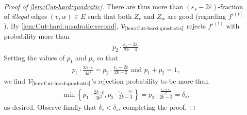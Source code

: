 \documentclass[11pt,fleqn]{article}
\renewcommand{\epsilon}{\varepsilon}
\renewcommand{\bar}{\overline}
\newcommand{\V}{\calV}
\newcommand{\f}{f}
\newcommand{\Vquad}{\V_{\text{\ref{lem:Cut-hard:quadratic}}}}
\newcommand{\calV}{\mathcal{V}}
\theoremstyle{definition}
\numberwithin{equation}{section}
\begin{document}
\begin{proof}[Proof of \cref{lem:Cut-hard:quadratic}]
There are thus more than $(\epsilon_s - 2 \bar{\epsilon})$-fraction of \emph{illegal} edges $(v,w) \in E$
such that both $Z_v$ and $Z_w$ are good (regarding $\f'^{(t)}$).
By \cref{lem:Cut-hard:quadratic:second},
$\Vquad$ rejects $\f'^{(t)}$ with probability more than
\begin{align}
    p_2 \cdot \frac{\epsilon_s - 2\bar{\epsilon}}{2k-3}.
\end{align}
Setting the values of $p_1$ and $p_2$ so that
\begin{align}
    p_1 \cdot \frac{2h \cdot \bar{\epsilon}}{3k^2}
    = p_2 \cdot \frac{\epsilon_s - 2\bar{\epsilon}}{2k-3}
    \text{ and } p_1+p_2 = 1,
\end{align}
we find $\Vquad$'s rejection probability to be more than
\begin{align}
    \min\left\{
        p_1 \cdot \frac{2h \cdot \bar{\epsilon}}{3k^2},
        p_2 \cdot \frac{\epsilon_s - 2\bar{\epsilon}}{2k-3}
    \right\}
    = p_2 \cdot \frac{\frac{\epsilon_s + \epsilon_c}{2}}{2k-3}
    = \delta_s,
\end{align}
as desired.
Observe finally that $\delta_c < \delta_s$, completing the proof.
\end{proof}
 
\printbibliography 
\end{document}
